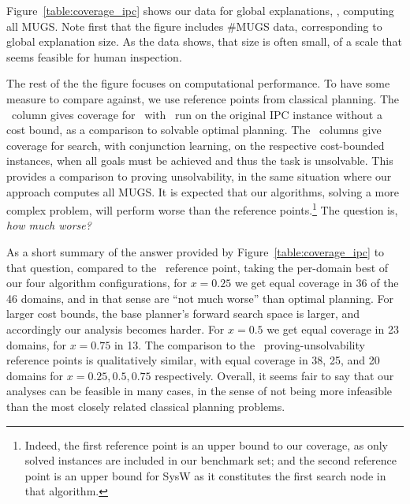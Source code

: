 Figure~\ref{table:coverage_ipc} shows our data for global
explanations, \ie, computing all MUGS. 
%
Note first that the figure includes \#MUGS data, corresponding to
global explanation size. As the data shows, that size is often small,
of a scale that seems feasible for human inspection.
%
%
%
%

The rest of the the figure focuses on computational performance. To
have some measure to compare against, we use reference points from
classical planning. The \hlmcut\ column gives coverage for \astar\
with \hlmcut\ run on the original IPC instance without a cost bound,
as a comparison to solvable optimal planning. The \hc\ columns give
coverage for search, with conjunction learning, on the respective
cost-bounded instances, when all goals must be achieved and thus the
task is unsolvable. This provides a comparison to proving
unsolvability, in the same situation where our approach computes all
MUGS.
%
It is expected that our algorithms, solving a more complex problem,
will perform worse than the reference points.\footnote{Indeed, the
first reference point is an upper bound to our coverage, as only
solved instances are included in our benchmark set; and the second
reference point is an upper bound for SysW as it constitutes the first
search node in that algorithm.} The question is, \emph{how much
worse?}

As a short summary of the answer provided by
Figure~\ref{table:coverage_ipc} to that question, compared to
the \hlmcut\ reference point, taking the per-domain best of our four
algorithm configurations, for $x=0.25$ we get equal coverage in 36 of
the 46 domains, and in that sense are ``not much worse'' than optimal
planning. For larger cost bounds, the base planner's forward search
space is larger, and accordingly our analysis becomes harder. For
$x=0.5$ we get equal coverage in 23 domains, for $x=0.75$ in 13. The
comparison to the \hc\ proving-unsolvability reference points is
qualitatively similar, with equal coverage in 38, 25, and 20 domains
for $x=0.25, 0.5, 0.75$ respectively. Overall, it seems fair to say
that our analyses can be feasible in many cases, in the sense of not
being more infeasible than the most closely related classical planning
problems. \joerg{add comparison to OSP planner?}

